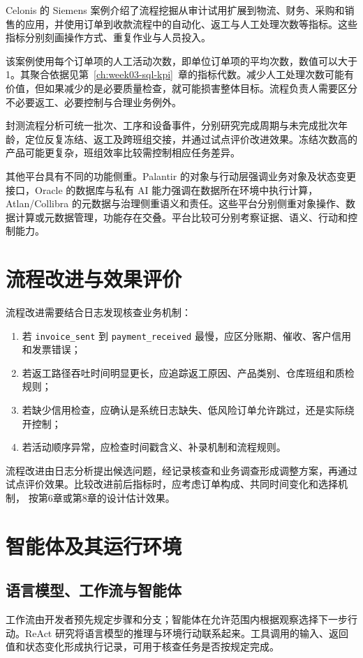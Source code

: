 Celonis 的 Siemens 案例介绍了流程挖掘从审计试用扩展到物流、财务、采购和销售的应用，并使用订单到收款流程中的自动化、返工与人工处理次数等指标\cite{celonis10}。这些指标分别刻画操作方式、重复作业与人员投入。

该案例使用每个订单项的人工活动次数，即单位订单项的平均次数，数值可以大于1。其聚合依据见第~\ref{ch:week03-sql-kpi}~章的指标代数。减少人工处理次数可能有价值，但如果减少的是必要质量检查，就可能损害整体目标。流程负责人需要区分不必要返工、必要控制与合理业务例外。

封测流程分析可统一批次、工序和设备事件，分别研究完成周期与未完成批次年龄，定位反复冻结、返工及跨班组交接，并通过试点评价改进效果。冻结次数高的产品可能更复杂，班组效率比较需控制相应任务差异。

其他平台具有不同的功能侧重。Palantir 的对象与行动层强调业务对象及状态变更接口，Oracle 的数据库与私有 AI 能力强调在数据所在环境中执行计算，Atlan/Collibra 的元数据与治理侧重语义和责任。这些平台分别侧重对象操作、数据计算或元数据管理，功能存在交叠。平台比较可分别考察证据、语义、行动和控制能力。

\section{流程改进与效果评价}

流程改进需要结合日志发现核查业务机制：
\begin{enumerate}
  \item 若 \texttt{invoice\_sent} 到 \texttt{payment\_received} 最慢，应区分账期、催收、客户信用和发票错误；
  \item 若返工路径吞吐时间明显更长，应追踪返工原因、产品类别、仓库班组和质检规则；
  \item 若缺少信用检查，应确认是系统日志缺失、低风险订单允许跳过，还是实际绕开控制；
  \item 若活动顺序异常，应检查时间戳含义、补录机制和流程规则。
\end{enumerate}

流程改进由日志分析提出候选问题，经记录核查和业务调查形成调整方案，再通过
试点评价效果。比较改进前后指标时，应考虑订单构成、共同时间变化和选择机制，
按第6章或第8章的设计估计效果。

\section{智能体及其运行环境}

\subsection{语言模型、工作流与智能体}
工作流由开发者预先规定步骤和分支；智能体在允许范围内根据观察选择下一步行动。ReAct 研究将语言模型的推理与环境行动联系起来\cite{react10}。工具调用的输入、返回值和状态变化形成执行记录，可用于核查任务是否按规定完成。

